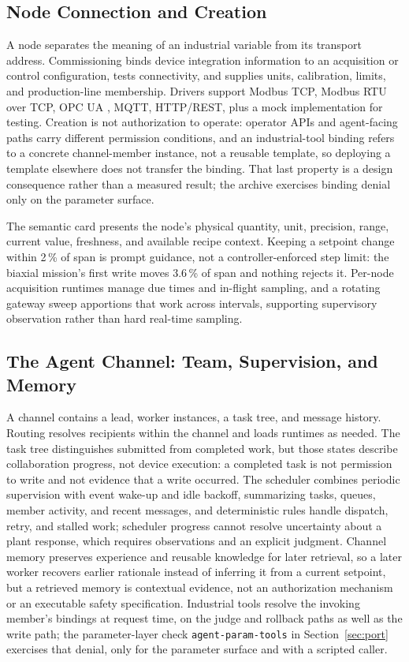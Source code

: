 \subsection{Node Connection and Creation}
\label{sec:nodes}
A node separates the meaning of an industrial variable from its transport address.
Commissioning binds device integration information to an acquisition or control
configuration, tests connectivity, and supplies units, calibration, limits, and
production-line membership. Drivers support Modbus TCP, Modbus RTU over TCP, OPC UA
\cite{iec62541}, MQTT, HTTP/REST, plus a mock implementation for testing. Creation
is not authorization to operate: operator APIs and agent-facing paths carry
different permission conditions, and an industrial-tool binding refers to a
concrete channel-member instance, not a reusable template, so deploying a template
elsewhere does not transfer the binding. That last property is a design consequence
rather than a measured result; the archive exercises binding denial only on the
parameter surface.

The semantic card presents the node's physical quantity, unit, precision, range,
current value, freshness, and available recipe context. Keeping a setpoint change
within 2\,\% of span is prompt guidance, not a controller-enforced step limit: the
biaxial mission's first write moves 3.6\,\% of span and nothing rejects it. Per-node
acquisition runtimes manage due times and in-flight sampling, and a rotating
gateway sweep apportions that work across intervals, supporting supervisory
observation rather than hard real-time sampling.

\subsection{The Agent Channel: Team, Supervision, and Memory}
\label{sec:channel}
A channel contains a lead, worker instances, a task tree, and message history.
Routing resolves recipients within the channel and loads runtimes as needed. The
task tree distinguishes submitted from completed work, but those states describe
collaboration progress, not device execution: a completed task is not permission to
write and not evidence that a write occurred. The scheduler combines periodic
supervision with event wake-up and idle backoff, summarizing tasks, queues, member
activity, and recent messages, and deterministic rules handle dispatch, retry, and
stalled work; scheduler progress cannot resolve uncertainty about a plant response,
which requires observations and an explicit judgment.
Channel
memory preserves experience and reusable knowledge for later retrieval, so a later
worker recovers earlier rationale instead of inferring it from a current setpoint,
but a retrieved memory is contextual evidence, not an authorization mechanism or an
executable safety specification. Industrial tools resolve the invoking member's
bindings at request time, on the judge and rollback paths as well as the write path;
the parameter-layer check \texttt{agent-param-tools} in Section~\ref{sec:port}
exercises that denial, only for the parameter surface and with a scripted caller.

